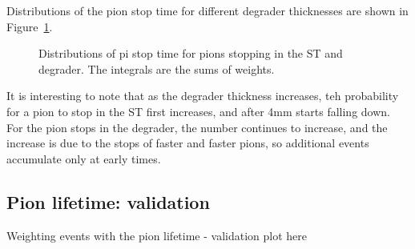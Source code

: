 Distributions of the pion stop time for different degrader thicknesses are shown in Figure~\ref{fig:pion_stop_time}.
\begin{figure}[H]
  \caption{
    \label{fig:pion_stop_time}
    Distributions of pi stop time for pions stopping in the ST and degrader. The integrals are the sums of weights.
  }
\end{figure}

It is interesting to note that as the degrader thickness increases, teh probability for a pion to stop
in the ST first increases, and after 4mm starts falling down. 
For the pion stops in the degrader, the number continues to increase, and the increase is due
to the stops of faster and faster pions, so additional events accumulate only at early times. 

\subsection {Pion lifetime: validation}

Weighting events with the pion lifetime - validation plot here

\begin{figure}[H]
  \caption{
    \label{fig:pion_lifetime}
  }
\end{figure}

